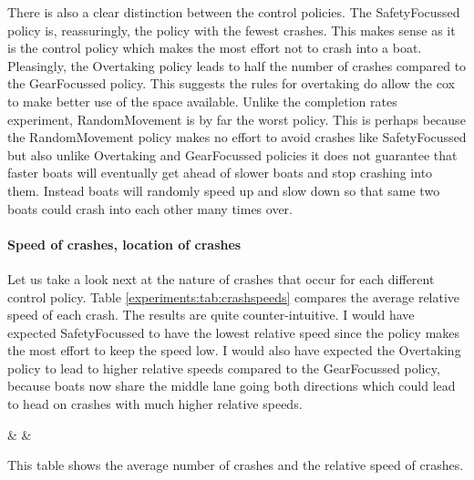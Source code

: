   There is also a clear distinction between the control policies. The SafetyFocussed policy is, reassuringly, the policy with the fewest crashes. This makes sense as it is the control policy which makes the most effort not to crash into a boat. Pleasingly, the Overtaking policy leads to half the number of crashes compared to the GearFocussed policy. This suggests the rules for overtaking do allow the cox to make better use of the space available. Unlike the completion rates experiment, RandomMovement is by far the worst policy. This is perhaps because the RandomMovement policy makes no effort to avoid crashes like SafetyFocussed but also unlike Overtaking and GearFocussed policies it does not guarantee that faster boats will eventually get ahead of slower boats and stop crashing into them. Instead boats will randomly speed up and slow down so that same two boats could crash into each other many times over.

  \paragraph{Speed of crashes, location of crashes}
  Let us take a look next at the nature of crashes that occur for each different control policy. Table \ref{experiments:tab:crashspeeds} compares the average relative speed of each crash. The results are quite counter-intuitive. I would have expected SafetyFocussed to have the lowest relative speed since the policy makes the most effort to keep the speed low. I would also have expected the Overtaking policy to lead to higher relative speeds compared to the GearFocussed policy, because boats now share the middle lane going both directions which could lead to head on crashes with much higher relative speeds.
  
  \begin{table}[h]
  \centering
  {\cp & \crashes & \speed}
  \caption{This table shows the average number of crashes and the relative speed of crashes.}
  \label{experiments:tab:crashspeeds}
  \end{table}
  
